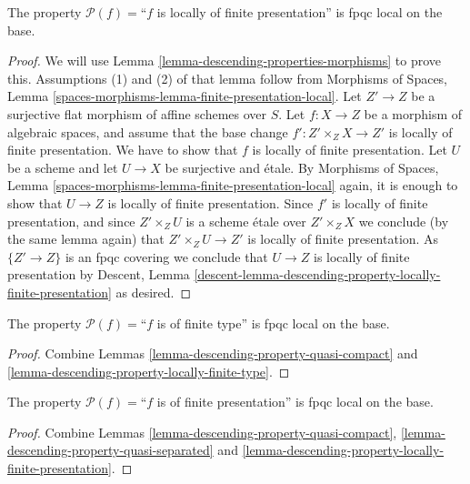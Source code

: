 \begin{lemma}
\label{lemma-descending-property-locally-finite-presentation}
The property $\mathcal{P}(f) =$``$f$ is locally of finite presentation''
is fpqc local on the base.
\end{lemma}

\begin{proof}
We will use
Lemma \ref{lemma-descending-properties-morphisms}
to prove this. Assumptions (1) and (2) of that lemma follow from
Morphisms of Spaces,
Lemma \ref{spaces-morphisms-lemma-finite-presentation-local}.
Let $Z' \to Z$ be a surjective flat morphism of affine schemes over $S$.
Let $f : X \to Z$ be a morphism of algebraic spaces, and assume
that the base change $f' : Z' \times_Z X \to Z'$ is locally of
finite presentation.
We have to show that $f$ is locally of finite presentation. Let $U$ be a scheme
and let $U \to X$ be surjective and \'etale. By
Morphisms of Spaces,
Lemma \ref{spaces-morphisms-lemma-finite-presentation-local}
again, it is enough to show that $U \to Z$ is locally of finite presentation.
Since $f'$ is locally of finite presentation, and since $Z' \times_Z U$ is a
scheme \'etale over $Z' \times_Z X$ we conclude (by the same lemma again) that
$Z' \times_Z U \to Z'$ is locally of finite presentation.
As $\{Z' \to Z\}$ is an fpqc covering we conclude that
$U \to Z$ is locally of finite presentation by
Descent,
Lemma \ref{descent-lemma-descending-property-locally-finite-presentation}
as desired.
\end{proof}

\begin{lemma}
\label{lemma-descending-property-finite-type}
The property $\mathcal{P}(f) =$``$f$ is of finite type''
is fpqc local on the base.
\end{lemma}

\begin{proof}
Combine Lemmas \ref{lemma-descending-property-quasi-compact}
and \ref{lemma-descending-property-locally-finite-type}.
\end{proof}

\begin{lemma}
\label{lemma-descending-property-finite-presentation}
The property $\mathcal{P}(f) =$``$f$ is of finite presentation''
is fpqc local on the base.
\end{lemma}

\begin{proof}
Combine Lemmas \ref{lemma-descending-property-quasi-compact},
\ref{lemma-descending-property-quasi-separated} and
\ref{lemma-descending-property-locally-finite-presentation}.
\end{proof}

